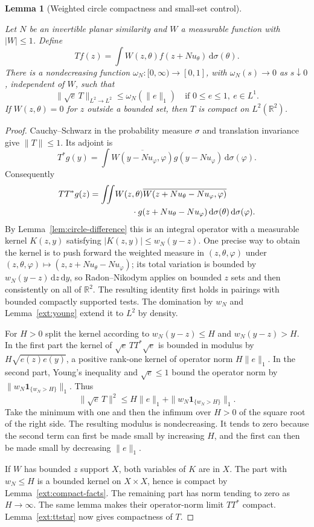 \documentclass[11pt]{amsart}
\newcommand{\R}{\mathbb R}
\newcommand{\dd}{\,\mathrm d}
\newcommand{\one}{\mathbf 1}
\newtheorem{lemma}[theorem]{Lemma}
\theoremstyle{definition}
\theoremstyle{remark}
\numberwithin{equation}{section}
\providecommand{\lean}[1]{}
\providecommand{\leanok}{}
\begin{document}
\begin{lemma}[Weighted circle compactness and small-set control]\label{lem:circle-compact}
\lean{Auto.circleOp,Auto.lem_circle_compact_small,Auto.lem_circle_compact}
\leanok
Let $N$ be an invertible planar similarity and $W$ a measurable
function with $|W|\le1$.  Define
\[
 Tf(z)=\int W(z,\theta)f(z+Nu_\theta)\dd\sigma(\theta).
\]
There is a nondecreasing function $\omega_N:[0,\infty)\to[0,1]$,
with $\omega_N(s)\to0$ as $s\downarrow0$, independent of $W$,
such that
\[
 \|\sqrt e\,T\|_{L^2\to L^2}\le\omega_N(\|e\|_1)
 \quad\text{if }0\le e\le1,\ e\in L^1.
\]
If $W(z,\theta)=0$ for $z$ outside a bounded set, then $T$ is
compact on $L^2(\R^2)$.
\end{lemma}
\begin{proof}
Cauchy--Schwarz in the probability measure $\sigma$ and translation
invariance give $\|T\|\le1$.
Its adjoint is
\[
 T^*g(y)=\int\overline{W(y-Nu_\varphi,\varphi)}
                         g(y-Nu_\varphi)\dd\sigma(\varphi).
\]
Consequently
\begin{align*}
 TT^*g(z)=\iint &W(z,\theta)
  \overline{W(z+Nu_\theta-Nu_\varphi,\varphi)}\\
 &\hspace{7mm}\cdot g(z+Nu_\theta-Nu_\varphi)
                   \dd\sigma(\theta)\dd\sigma(\varphi).
\end{align*}
By Lemma~\ref{lem:circle-difference} this is an integral operator
with a measurable kernel $K(z,y)$ satisfying
$|K(z,y)|\le w_N(y-z)$.  One precise way to obtain the kernel is
to push forward the weighted measure in $(z,\theta,\varphi)$
under $(z,\theta,\varphi)\mapsto(z,z+Nu_\theta-Nu_\varphi)$;
its total variation is bounded by
$w_N(y-z)\dd z\dd y$, so Radon--Nikodym applies on bounded
$z$ sets and then consistently on all of $\R^2$.
The resulting identity first holds in pairings with bounded compactly
supported tests.  The domination by $w_N$ and
Lemma~\ref{ext:young} extend it to $L^2$ by density.

For $H>0$ split the kernel according to $w_N(y-z)\le H$ and
$w_N(y-z)>H$.  In the first part the kernel of
$\sqrt e\,TT^*\sqrt e$ is bounded in modulus by
$H\sqrt{e(z)e(y)}$, a positive rank-one kernel of operator
norm $H\|e\|_1$.  In the second part, Young's inequality and
$\sqrt e\le1$ bound the operator norm by
$\|w_N\one_{\{w_N>H\}}\|_1$.  Thus
\begin{equation}\label{eq:circle-modulus}
 \|\sqrt e\,T\|^2
  \le H\|e\|_1+\|w_N\one_{\{w_N>H\}}\|_1.
\end{equation}
Take the minimum with one and then the infimum over $H>0$ of
the square root of the right side.  The resulting modulus is
nondecreasing.  It tends to zero because the second term can
first be made small by increasing $H$, and the first can then
be made small by decreasing $\|e\|_1$.

If $W$ has bounded $z$ support $X$, both variables of $K$ are
in $X$.  The part with $w_N\le H$ is a bounded kernel on
$X\times X$, hence is compact by Lemma~\ref{ext:compact-facts}.
The remaining part has norm tending to zero as $H\to\infty$.
The same lemma makes their operator-norm limit $TT^*$ compact.
Lemma~\ref{ext:ttstar} now gives compactness of $T$.
\end{proof}
\end{document}

